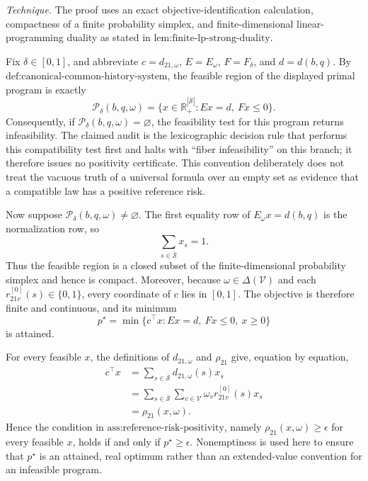 \emph{Technique.}  The proof uses an exact objective-identification calculation, compactness of a finite probability simplex, and finite-dimensional linear-programming duality as stated in \(\text{lem:finite-lp-strong-duality}\).

Fix \(\delta\in[0,1]\), and abbreviate \(c=d_{21,\omega}\), \(E=E_\omega\), \(F=F_\delta\), and \(d=d(b,q)\).  By \(\text{def:canonical-common-history-system}\), the feasible region of the displayed primal program is exactly
\[
 \mathcal P_\delta(b,q,\omega)
 =\{x\in\mathbb R_+^{|\overline{\mathcal S}|}:Ex=d,\ Fx\leq0\}.
\]
Consequently, if \(\mathcal P_\delta(b,q,\omega)=\varnothing\), the feasibility test for this program returns infeasibility.  The claimed audit is the lexicographic decision rule that performs this compatibility test first and halts with ``fiber infeasibility'' on this branch; it therefore issues no positivity certificate.  This convention deliberately does not treat the vacuous truth of a universal formula over an empty set as evidence that a compatible law has a positive reference risk.

Now suppose \(\mathcal P_\delta(b,q,\omega)\neq\varnothing\).  The first equality row of \(E_\omega x=d(b,q)\) is the normalization row, so
\[
 \sum_{s\in\overline{\mathcal S}}x_s=1.
\]
Thus the feasible region is a closed subset of the finite-dimensional probability simplex and hence is compact.  Moreover, because \(\omega\in\Delta(\mathcal V)\) and each \(r^{[0]}_{21v}(s)\in\{0,1\}\), every coordinate of \(c\) lies in \([0,1]\).  The objective is therefore finite and continuous, and its minimum
\[
 p^\star=\min\{c^\top x:Ex=d,\ Fx\leq0,\ x\geq0\}
\]
is attained.

For every feasible \(x\), the definitions of \(d_{21,\omega}\) and \(\rho_{21}\) give, equation by equation,
\[
 \begin{aligned}
 c^\top x
 &=\sum_{s\in\overline{\mathcal S}}d_{21,\omega}(s)x_s\\
 &=\sum_{s\in\overline{\mathcal S}}\sum_{v\in\mathcal V}
      \omega_v r^{[0]}_{21v}(s)x_s\\
 &=\rho_{21}(x,\omega).
 \end{aligned}
\]
Hence the condition in \(\text{ass:reference-risk-positivity}\), namely
\(\rho_{21}(x,\omega)\geq\epsilon\) for every feasible \(x\), holds if and only if \(p^\star\geq\epsilon\).  Nonemptiness is used here to ensure that \(p^\star\) is an attained, real optimum rather than an extended-value convention for an infeasible program.


